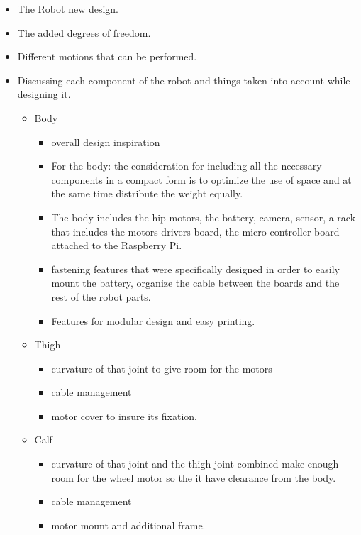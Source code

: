 \begin{itemize}
	\item The Robot new design.
	\item The added degrees of freedom.
	\item Different motions that can be performed.
	\item Discussing each component of the robot and things taken into account while designing it.
	\begin{itemize}
		\item Body
		\begin{itemize}
		\item overall design inspiration
		\item For the body: the consideration for including all the necessary components in a compact form is to optimize the use of space and at the same time distribute the weight equally.
		\item The body includes the hip motors, the battery, camera, sensor, a rack that includes the motors drivers board, the micro-controller board attached to the Raspberry Pi.
		\item fastening features that were specifically designed in order to easily mount the battery, organize the cable between the boards and the rest of the robot parts.
		\item Features for modular design and easy printing.
		\end{itemize}
			\item Thigh
		\begin{itemize}
			\item curvature of that joint to give room for the motors 
			\item cable management 
			\item motor cover to insure its fixation. 
		\end{itemize}
			\item Calf
		\begin{itemize}
			\item curvature of that joint and the thigh joint combined make enough room for the wheel motor so the it have clearance from the body. 
			\item cable management 
			\item motor mount and additional frame.
		\end{itemize}
	\end{itemize}
\end{itemize}





